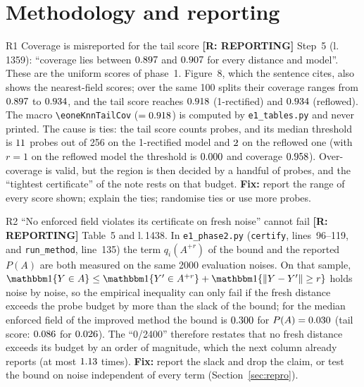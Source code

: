 \documentclass[11pt]{article}
\newcommand{\file}[1]{\texttt{#1}}
\newcommand{\lin}[1]{l.\,#1}
\newcommand{\mac}[1]{\texttt{\textbackslash #1}}
\newcommand{\badge}[2]{\textcolor{#1}{\textbf{[#2]}}}
\newcommand{\Srep}{\badge{warnOr}{R: REPORTING}}
\begin{document}
\section{Methodology and reporting}\label{sec:method}

\begin{findbox}{R1 \quad Coverage is misreported for the tail score \hfill \Srep}
Step~5 (\lin{1359}): ``coverage lies between $0.897$ and $0.907$ for every distance and model''. These are the uniform scores of phase~1.
Figure~8, which the sentence cites, also shows the nearest-field scores; over the same 100 splits their coverage ranges from
$0.897$ to $0.934$, and the tail score reaches $0.918$ (1-rectified) and $0.934$ (reflowed). The macro
\mac{eoneKnnTailCov} ($=0.918$) is computed by \file{e1\_tables.py} and never printed. The cause is ties: the tail score counts probes,
and its median threshold is $11$ probes out of 256 on the 1-rectified model and $2$ on the reflowed one (with $r=1$
on the reflowed model the threshold is $0.000$ and coverage $0.958$). Over-coverage is valid, but the region is then
decided by a handful of probes, and the ``tightest certificate'' of the note rests on that budget. \textbf{Fix:} report the
range of every score shown; explain the ties; randomise ties or use more probes.
\end{findbox}

\begin{findbox}{R2 \quad ``No enforced field violates its certificate on fresh noise'' cannot fail \hfill \Srep}
Table~5 and \lin{1438}. In \file{e1\_phase2.py} (\texttt{certify}, lines~96--119, and \texttt{run\_method}, line~135) the term
$q_i(A^{+r})$ of the bound and the reported $P(A)$ are both measured on the same 2000 evaluation noises. On that sample,
$\mathbbm1\{Y\in A\}\le\mathbbm1\{Y'\in A^{+r}\}+\mathbbm1\{\|Y-Y'\|\ge r\}$ holds noise by noise, so the empirical inequality can only fail
if the fresh distance exceeds the probe budget by more than the slack of the bound; for the median enforced field of the
improved method the bound is $0.300$ for $P(A)=0.030$ (tail score: $0.086$ for $0.026$). The ``0/2400'' therefore
restates that no fresh distance exceeds its budget by an order of magnitude, which the next column already reports
(at most $1.13$ times). \textbf{Fix:} report the slack and drop the claim, or test the bound on noise independent of every
term (Section~\ref{sec:repro}).
\end{findbox}
\end{document}
